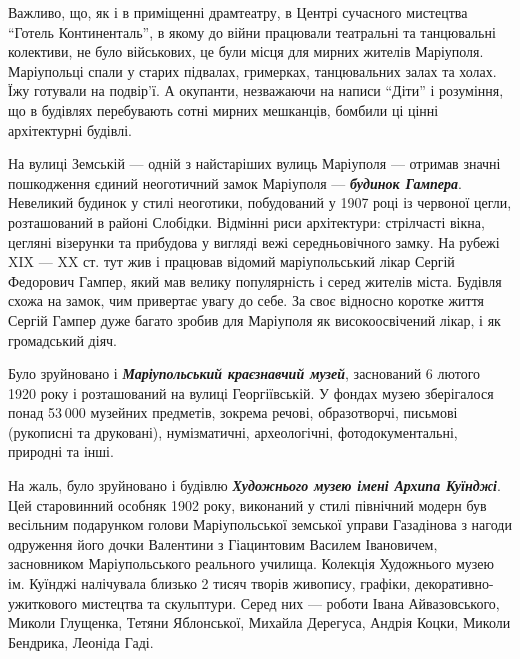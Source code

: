 Важливо, що, як і в приміщенні драмтеатру, в Центрі сучасного мистецтва \enquote{Готель
Континенталь}, в якому до війни працювали театральні та танцювальні колективи,
не було військових, це були місця для мирних жителів Маріуполя. Маріупольці
спали у старих підвалах, гримерках, танцювальних залах та холах. Їжу готували
на подвір'ї. А окупанти, незважаючи на написи \enquote{Діти} і розуміння, що в будівлях
перебувають сотні мирних мешканців, бомбили ці цінні архітектурні будівлі.


На вулиці Земській — одній з найстаріших вулиць Маріуполя — отримав значні
пошкодження єдиний неоготичний замок Маріуполя — \emph{\textbf{будинок Гампера}}. Невеликий
будинок у стилі неоготики, побудований у 1907 році із червоної цегли,
розташований в районі Слобідки. Відмінні риси архітектури: стрілчасті вікна,
цегляні візерунки та прибудова у вигляді вежі середньовічного замку. На рубежі
XIX — XX ст. тут жив і працював відомий маріупольський лікар Сергій Федорович
Гампер, який мав велику популярність і серед жителів міста. Будівля схожа на
замок, чим привертає увагу до себе. За своє відносно коротке життя Сергій
Гампер дуже багато зробив для Маріуполя як високоосвічений лікар, і як
громадський діяч.


Було зруйновано і \emph{\textbf{Маріупольський краєзнавчий музей}}, заснований 6 лютого 1920
року і розташований на вулиці Георгіївській. У фондах музею зберігалося понад
53 000 музейних предметів, зокрема речові, образотворчі, письмові (рукописні та
друковані), нумізматичні, археологічні, фотодокументальні, природні та інші.

На жаль, було зруйновано і будівлю \emph{\textbf{Художнього музею імені Архипа Куїнджі}}. Цей
старовинний особняк 1902 року, виконаний у стилі північний модерн був весільним
подарунком голови Маріупольської земської управи Газадінова з нагоди одруження
його дочки Валентини з Гіацинтовим Василем Івановичем, засновником
Маріупольського реального училища. Колекція Художнього музею ім. Куїнджі
налічувала близько 2 тисяч творів живопису, графіки, декоративно-ужиткового
мистецтва та скульптури. Серед них — роботи Івана Айвазовського, Миколи
Глущенка, Тетяни Яблонської, Михайла Дерегуса, Андрія Коцки, Миколи Бендрика,
Леоніда Гаді.

